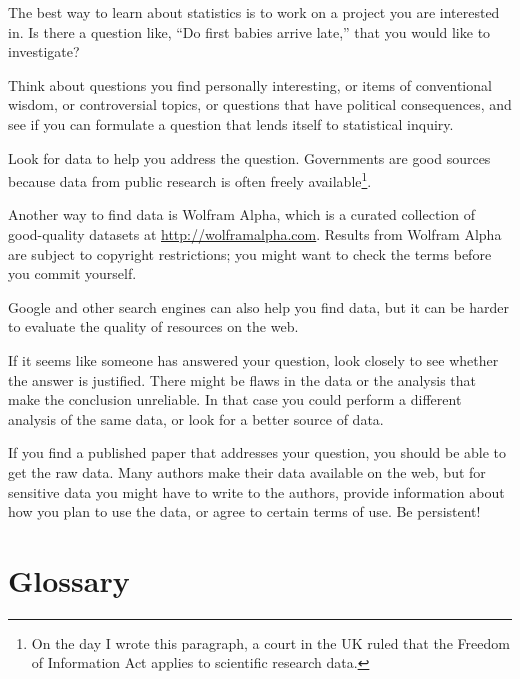 \documentclass[12pt]{book}
\begin{document}
\begin{exercise}
The best way to learn about statistics is to work on a project you are
interested in.  Is there a question like, ``Do first babies arrive
late,'' that you would like to investigate?

Think about questions you find personally interesting, or items of
conventional wisdom, or controversial topics, or questions that have
political consequences, and see if you can formulate a question that
lends itself to statistical inquiry.

Look for data to help you address the question.  Governments are good
sources because data from public research is often freely
available\footnote{On the day I wrote this paragraph, a court in the
  UK ruled that the Freedom of Information Act applies to scientific
  research data.}.

Another way to find data is Wolfram Alpha, which is a curated
collection of good-quality datasets at \url{http://wolframalpha.com}.
Results from Wolfram Alpha are subject to copyright
restrictions; you might want to check the terms before you commit
yourself.

Google and other search engines can also help you find data, but it
can be harder to evaluate the quality of resources on the web.

If it seems like someone has answered your question, look closely to
see whether the answer is justified.  There might be flaws in the data
or the analysis that make the conclusion unreliable.  In that case you
could perform a different analysis of the same data, or look for a
better source of data.

If you find a published paper that addresses your question, you
should be able to get the raw data.  Many authors make their data
available on the web, but for sensitive data you might have to
write to the authors, provide information about how you plan to use
the data, or agree to certain terms of use.  Be persistent!

\end{exercise}


\section{Glossary}
\end{document}
